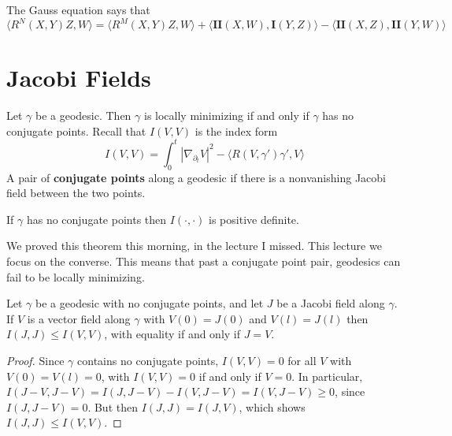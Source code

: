 The Gauss equation says that
%
\[ \langle R^N(X,Y)Z,W \rangle = \langle R^M(X,Y)Z,W \rangle + \langle \mathbf{II}(X,W), \mathbf{I}(Y,Z) \rangle - \langle \mathbf{II}(X,Z), \mathbf{II}(Y,W) \rangle \]


\section{Jacobi Fields}

Let $\gamma$ be a geodesic. Then $\gamma$ is locally minimizing if and only if $\gamma$ has no conjugate points. Recall that $I(V,V)$ is the index form
%
\[ I(V,V) = \int_0^t \left| \nabla_{\partial_t} V \right|^2 - \langle R(V,\gamma') \gamma', V \rangle \]
%
A pair of {\bf conjugate points} along a geodesic if there is a nonvanishing Jacobi field between the two points.

\begin{theorem}
    If $\gamma$ has no conjugate points then $I(\cdot,\cdot)$ is positive definite.
\end{theorem}

We proved this theorem this morning, in the lecture I missed. This lecture we focus on the converse. This means that past a conjugate point pair, geodesics can fail to be locally minimizing.

\begin{theorem}
    Let $\gamma$ be a geodesic with no conjugate points, and let $J$ be a Jacobi field along $\gamma$. If $V$ is a vector field along $\gamma$ with $V(0) = J(0)$ and $V(l) = J(l)$ then $I(J,J) \leq I(V,V)$, with equality if and only if $J = V$.
\end{theorem}
\begin{proof}
    Since $\gamma$ contains no conjugate points, $I(V,V) = 0$ for all $V$ with $V(0) = V(l) = 0$, with $I(V,V) = 0$ if and only if $V = 0$. In particular, $I(J-V,J-V) = I(J,J-V) - I(V,J-V) = I(V,J-V) \geq 0$, since $I(J,J-V) = 0$. But then $I(J,J) = I(J,V)$, which shows $I(J,J) \leq I(V,V)$.
\end{proof}

